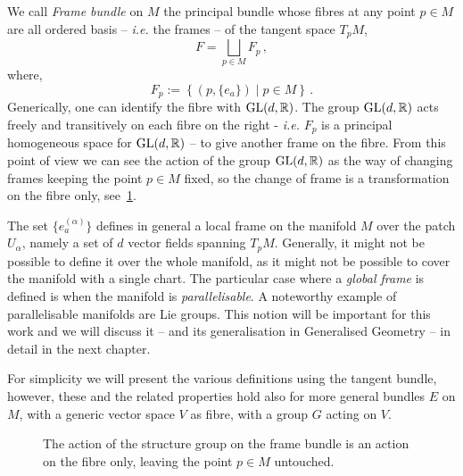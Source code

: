 \documentclass[debug]{phd}
\begin{document}
						
						We call \emph{Frame bundle} on $M$ the principal bundle whose fibres at any point $p \in M$ are all ordered basis -- \emph{i.e.} the frames -- of the tangent space $T_p M$, 
						\begin{equation}\label{framebund}
							F = \bigsqcup_{p \in M} F_p\, ,
						\end{equation}
				where,
						\begin{equation}
							F_p := \left\{ (p, \{ e_a \}) \mid p \in M \right\}\, .
						\end{equation}
				Generically, one can identify the fibre with $\mathrm{GL}(d,\mathbb{R})$.
				The group $\mathrm{GL}(d,\mathbb{R})$ acts freely and transitively on each fibre on the right - \emph{i.e.} $F_p$ is a principal homogeneous space for $\mathrm{GL}(d,\mathbb{R})$ -- to give another frame on the fibre. 
				From this point of view we can see the action of the group $\mathrm{GL}(d,\mathbb{R})$ as the way of changing frames keeping the point $p \in M$ fixed, so the change of frame is a transformation on the fibre only, see~\cref{gactfibre}.
				
				The set $\{e^{(\alpha)}_a\}$ defines in general a local frame on the manifold $M$ over the patch $U_{\alpha}$, namely a set of $d$ vector fields spanning $T_p M$. 
				Generally, it might not be possible to define it over the whole manifold, as it might not be possible to cover the manifold with a single chart.
				The particular case where a \emph{global frame} is defined is when the manifold is \emph{parallelisable}. 
				A noteworthy example of parallelisable manifolds are Lie groups. 
				This notion will be important for this work and we will discuss it -- and its generalisation in Generalised Geometry -- in detail in the next chapter.
				
				For simplicity we will present the various definitions using the tangent bundle, however, these and the related properties hold also for more general bundles $E$ on $M$, with a generic vector space $V$ as fibre, with a group $G$ acting on $V$.
						
						\begin{figure}[h]
							\centering
								\scalebox{1.5}{}
								\caption{The action of the structure group on the frame bundle is an action on the fibre only, leaving the point $p \in M$ untouched.}
								\label{gactfibre}
							\end{figure}
						
\end{document}
